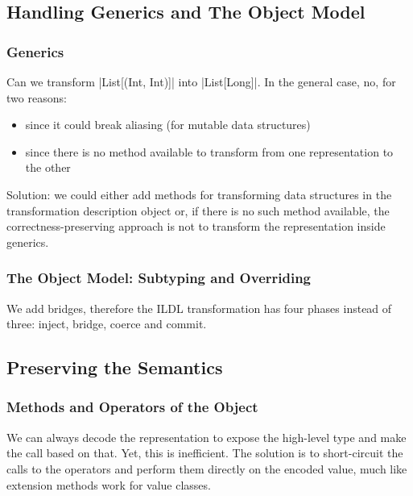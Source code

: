 \subsection{Handling Generics and The Object Model}
\label{sec:ildl:generics}

\subsubsection{Generics}

Can we transform |List[(Int, Int)]| into |List[Long]|. In the general case, no, for two reasons:
\begin{itemize}
  \item since it could break aliasing (for mutable data structures)
  \item since there is no method available to transform from one representation to the other
\end{itemize}

Solution: we could either add methods for transforming data structures in the transformation description object or, if there is no such method available, the correctness-preserving approach is not to transform the representation inside generics.


\subsubsection{The Object Model: Subtyping and Overriding}
We add bridges, therefore the ILDL transformation has four phases instead of three: inject, bridge, coerce and commit.


\subsection{Preserving the Semantics}
\label{sec:ildl:semantics}

\subsubsection{Methods and Operators of the Object}
We can always decode the representation to expose the high-level type and make the call based on that. Yet, this is inefficient. The solution is to short-circuit the calls to the operators and perform them directly on the encoded value, much like extension methods work for value classes.

